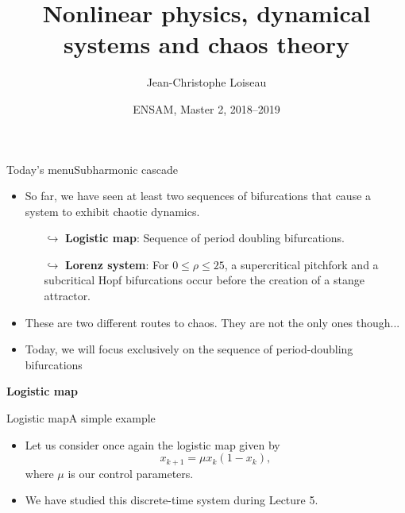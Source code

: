 \documentclass[usenames,dvipsnames,svgnames,10pt,aspectratio=169]{beamer}
\title[Nonlinear Physics] %
{
	Nonlinear physics, dynamical \\ systems and chaos theory
}
\author[J.-Ch.~Loiseau] %
{
	Jean-Christophe Loiseau
}
\institute[unused]
{
	\url{jean-christophe.loiseau@ensam.eu} \\
	DynFluid, \\
	Arts et M\'etiers ParisTech, France
}
\date[unused]{ENSAM, Master 2, 2018--2019}
\begin{document}
\titleframe %


\begin{frame}[t, c]{Today's menu}{Subharmonic cascade}
	\begin{itemize}
		\item So far, we have seen at least two sequences of bifurcations that cause a system to exhibit chaotic dynamics.
		\begin{itemize}
			\item[$\hookrightarrow$] \alert{\textbf{Logistic map}}: Sequence of period doubling bifurcations.
			\item[$\hookrightarrow$] \alert{\textbf{Lorenz system}}: For $0 \leq \rho \leq 25$, a supercritical pitchfork and a subcritical Hopf bifurcations occur before the creation of a stange attractor.
		\end{itemize}

		\bigskip

		\item These are two different routes to chaos. They are not the only ones though...

		\bigskip

		\item Today, we will focus exclusively on the sequence of period-doubling bifurcations
	\end{itemize}

	\vspace{1cm}
\end{frame}

\begin{frame}[t, c]{}
	\centering
	\vspace{1cm}

	{\Large \textbf{Logistic map}}

	\bigskip

	{}

\end{frame}

\begin{frame}[t, c]{Logistic map}{A simple example}
	\begin{itemize}
		\item Let us consider once again the logistic map given by
		$$x_{k+1} = \mu x_k ( 1 - x_k),$$
		where $\mu$ is our control parameters.

		\bigskip

		\item We have studied this discrete-time system during Lecture 5.
	\end{itemize}

	\vspace{1cm}
\end{frame}
\end{document}
